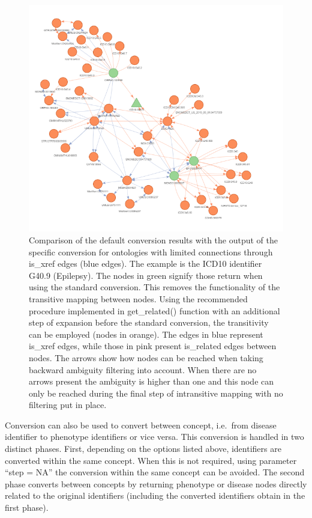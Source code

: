 \documentclass[9pt,a4paper,]{extarticle}
\begin{document}
\begin{figure}

{\centering \includegraphics[width=1\linewidth]{fig/get_related_ambiguity_NULL_G409} 

}

\caption{Comparison of the default conversion results with the output of the specific conversion for ontologies with limited connections through is\_xref edges (blue edges). The example is the ICD10 identifier G40.9 (Epilepsy). The nodes in green signify those return when using the standard conversion. This removes the functionality of the transitive mapping between nodes. Using the recommended procedure implemented in get\_related() function with an additional step of expansion before the standard conversion, the transitivity can be employed (nodes in orange). The edges in blue represent is\_xref edges, while those in pink present is\_related edges between nodes. The arrows show how nodes can be reached when taking backward ambiguity filtering into account. When there are no arrows present the ambiguity is higher than one and this node can only be reached during the final step of intransitive mapping with no filtering put in place.}\label{fig:getRelated}
\end{figure}

Conversion can also be used to convert between concept, i.e.~from disease identifier to phenotype identifiers or vice versa. This conversion is handled in two distinct phases. First, depending on the options listed above, identifiers are converted within the same concept. When this is not required, using parameter ``step = NA'' the conversion within the same concept can be avoided. The second phase converts between concepts by returning phenotype or disease nodes directly related to the original identifiers (including the converted identifiers obtain in the first phase).
\end{document}
